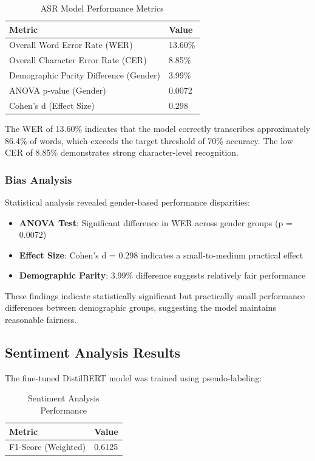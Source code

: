 \documentclass[12pt,a4paper]{report}
\begin{document}
\begin{table}[H]
\centering
\caption{ASR Model Performance Metrics}
\label{tab:asr_results}
\begin{tabular}{@{}ll@{}}
\toprule
\textbf{Metric} & \textbf{Value} \\ \midrule
Overall Word Error Rate (WER) & 13.60\% \\
Overall Character Error Rate (CER) & 8.85\% \\
Demographic Parity Difference (Gender) & 3.99\% \\
ANOVA p-value (Gender) & 0.0072 \\
Cohen's d (Effect Size) & 0.298 \\ \bottomrule
\end{tabular}
\end{table}

The WER of 13.60\% indicates that the model correctly transcribes approximately 86.4\% of words, which exceeds the target threshold of 70\% accuracy. The low CER of 8.85\% demonstrates strong character-level recognition.

\subsubsection{Bias Analysis}
Statistical analysis revealed gender-based performance disparities:

\begin{itemize}
    \item \textbf{ANOVA Test}: Significant difference in WER across gender groups (p = 0.0072)
    \item \textbf{Effect Size}: Cohen's d = 0.298 indicates a small-to-medium practical effect
    \item \textbf{Demographic Parity}: 3.99\% difference suggests relatively fair performance
\end{itemize}

These findings indicate statistically significant but practically small performance differences between demographic groups, suggesting the model maintains reasonable fairness.

\subsection{Sentiment Analysis Results}
The fine-tuned DistilBERT model was trained using pseudo-labeling:

\begin{table}[H]
\centering
\caption{Sentiment Analysis Performance}
\label{tab:sentiment_results}
\begin{tabular}{@{}ll@{}}
\toprule
\textbf{Metric} & \textbf{Value} \\ \midrule
F1-Score (Weighted) & 0.6125 \\ \bottomrule
\end{tabular}
\end{table}
\end{document}
